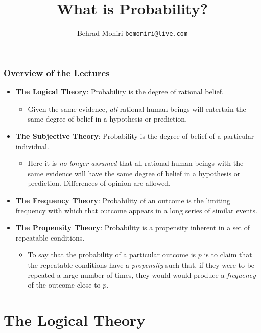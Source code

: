 \documentclass[usenames,dvipsnames, 10pt]{beamer}
\title[Philosophy of Probability]{‌\vspace{0.5cm}\\
What is Probability?\\\vspace{0.2cm}{\large A Review of Philosophical Theories of Probability}}
\author[Behrad Moniri]{
  Behrad Moniri
  \pdfnewline
  \texttt{bemoniri@live.com}
}
\institute{\small{Sharif University of Technology}}
\begin{document}
\begin{frame}
\titlepage
\end{frame}

\begin{frame}
	\frametitle{Overview of the Lectures}
	\begin{itemize}
		\item \textbf{The Logical Theory}: Probability is the degree of rational belief.
		\pause
		\begin{itemize}
			\item Given the same evidence, \emph{all} rational human beings will entertain the same degree of belief in a hypothesis or prediction.
		\end{itemize}
		\pause
		\item \textbf{The Subjective Theory}: Probability is the degree of belief of a particular individual. 
		\pause
		\begin{itemize}
			\item Here it is \emph{no longer assumed} that all rational human beings with the same evidence will have the same degree of belief in a hypothesis or prediction. Differences of opinion are allowed.
		\end{itemize}
		
		\pause
		\item \textbf{The Frequency Theory}: Probability of an outcome is the limiting frequency with which that outcome appears in a long series of similar events.
		\pause
		
		\item \textbf{The Propensity Theory}: Probability is a propensity inherent in a set of repeatable conditions. 
		\pause
		\begin{itemize}
			\item To say that the probability of a particular outcome is $p$ is to claim that the repeatable conditions have a \emph{propensity} such that, if they were to be repeated a large number of times, they would would produce a \emph{frequency} of the outcome close to $p$.
		\end{itemize}				
	\end{itemize}
\end{frame}


\section{The Logical Theory}
\end{document}
